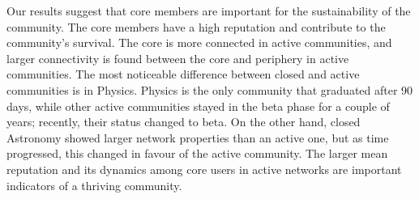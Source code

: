 Our results suggest that core members are important for the sustainability of the community. The core members have a high reputation and contribute to the community’s survival. The core is more connected in active communities, and larger connectivity is found between the core and periphery in active communities. The most noticeable difference between closed and active communities is in Physics. Physics is the only community that graduated after 90 days, while other active communities stayed in the beta phase for a couple of years; recently, their status changed to beta. On the other hand, closed Astronomy showed larger network properties than an active one, but as time progressed, this changed in favour of the active community. The larger mean reputation and its dynamics among core users in active networks are important indicators of a thriving community.

